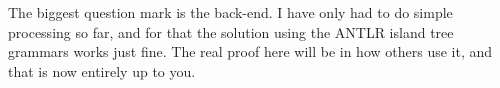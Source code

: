 \documentclass[a4paper]{article}
\begin{document}
The biggest question mark is the back-end. I have only had to do simple processing so far, and for that the solution using the ANTLR island tree grammars works just fine. The real proof here will be in how others use it, and that is now entirely up to you.





\end{document}
